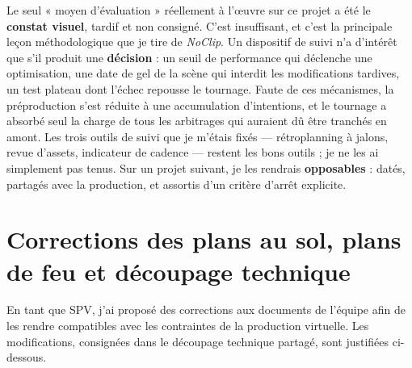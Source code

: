 \documentclass[11pt,a4paper]{report}
\begin{document}
\begin{notebox}[title={Ce que ce calendrier dit du pilotage --- et ce qu'il faut en retenir}]
Le seul « moyen d'évaluation » réellement à l'\oe uvre sur ce projet a été le \textbf{constat visuel},
tardif et non consigné. C'est insuffisant, et c'est la principale leçon méthodologique que je tire
de \textit{NoClip}. Un dispositif de suivi n'a d'intérêt que s'il produit une \textbf{décision} : un
seuil de performance qui déclenche une optimisation, une date de gel de la scène qui interdit
les modifications tardives, un test plateau dont l'échec repousse le tournage. Faute de ces
mécanismes, la préproduction s'est réduite à une accumulation d'intentions, et le tournage a
absorbé seul la charge de tous les arbitrages qui auraient dû être tranchés en amont. Les trois
outils de suivi que je m'étais fixés --- rétroplanning à jalons, revue d'assets, indicateur de
cadence --- restent les bons outils ; je ne les ai simplement pas tenus. Sur un projet suivant, je
les rendrais \textbf{opposables} : datés, partagés avec la production, et assortis d'un critère
d'arrêt explicite.
\end{notebox}

\section{Corrections des plans au sol, plans de feu et découpage technique}
En tant que SPV, j'ai proposé des corrections aux documents de l'équipe afin de les rendre compatibles avec les contraintes de la production virtuelle. Les modifications, consignées dans le découpage technique partagé, sont justifiées ci-dessous.
\end{document}
